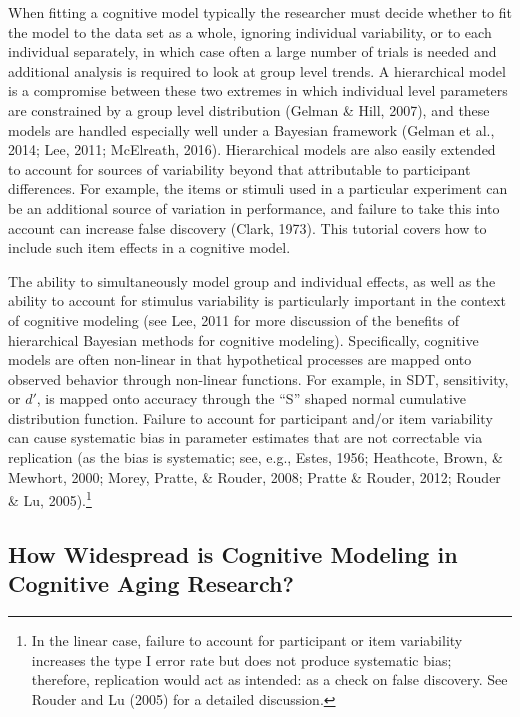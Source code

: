 \documentclass[
  english,
  ,man,floatsintext]{apa6}
\begin{document}
When fitting a cognitive model typically the researcher must decide whether to fit the model to the data set as a whole, ignoring individual variability, or to each individual separately, in which case often a large number of trials is needed and additional analysis is required to look at group level trends. A hierarchical model is a compromise between these two extremes in which individual level parameters are constrained by a group level distribution (Gelman \& Hill, 2007), and these models are handled especially well under a Bayesian framework (Gelman et al., 2014; Lee, 2011; McElreath, 2016). Hierarchical models are also easily extended to account for sources of variability beyond that attributable to participant differences. For example, the items or stimuli used in a particular experiment can be an additional source of variation in performance, and failure to take this into account can increase false discovery (Clark, 1973). This tutorial covers how to include such item effects in a cognitive model.

The ability to simultaneously model group and individual effects, as well as the ability to account for stimulus variability is particularly important in the context of cognitive modeling (see Lee, 2011 for more discussion of the benefits of hierarchical Bayesian methods for cognitive modeling). Specifically, cognitive models are often non-linear in that hypothetical processes are mapped onto observed behavior through non-linear functions. For example, in SDT, sensitivity, or \(d'\), is mapped onto accuracy through the \enquote{S} shaped normal cumulative distribution function. Failure to account for participant and/or item variability can cause systematic bias in parameter estimates that are not correctable via replication (as the bias is systematic; see, e.g., Estes, 1956; Heathcote, Brown, \& Mewhort, 2000; Morey, Pratte, \& Rouder, 2008; Pratte \& Rouder, 2012; Rouder \& Lu, 2005).\footnote{In the linear case, failure to account for participant or item variability increases the type I error rate but does not produce systematic bias; therefore, replication would act as intended: as a check on false discovery. See Rouder and Lu (2005) for a detailed discussion.}

\hypertarget{how-widespread-is-cognitive-modeling-in-cognitive-aging-research}{%
\subsection{How Widespread is Cognitive Modeling in Cognitive Aging Research?}\label{how-widespread-is-cognitive-modeling-in-cognitive-aging-research}}
\end{document}
